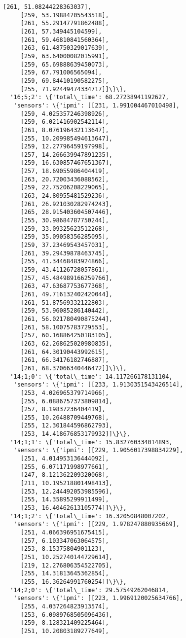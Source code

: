 \documentclass[11pt]{article}
\begin{document}
\begin{tcolorbox}[breakable, size=fbox, boxrule=.5pt, pad at break*=1mm, opacityfill=0]
\begin{Verbatim}[commandchars=\\\{\}]
     [261, 51.08244228363037],
     [259, 53.19884705543518],
     [261, 55.29147791862488],
     [261, 57.349445104599],
     [261, 59.46810841560364],
     [263, 61.48750329017639],
     [259, 63.64000082015991],
     [259, 65.69888639450073],
     [259, 67.791006565094],
     [259, 69.84410190582275],
     [255, 71.92449474334717]]\}\},
  '16;5;2': \{'total\_time': 68.27238941192627,
   'sensors': \{'ipmi': [[231, 1.991004467010498],
     [259, 4.025357246398926],
     [259, 6.021416902542114],
     [261, 8.076196432113647],
     [255, 10.209985494613647],
     [259, 12.27796459197998],
     [257, 14.266639947891235],
     [259, 16.630857467651367],
     [257, 18.69055986404419],
     [263, 20.72003436088562],
     [259, 22.75206208229065],
     [263, 24.80955481529236],
     [261, 26.921030282974243],
     [265, 28.915403604507446],
     [255, 30.98684787750244],
     [259, 33.09325623512268],
     [259, 35.09058356285095],
     [259, 37.23469543457031],
     [261, 39.29439878463745],
     [255, 41.34468483924866],
     [259, 43.41126728057861],
     [257, 45.484989166259766],
     [263, 47.63687753677368],
     [261, 49.716132402420044],
     [261, 51.87569332122803],
     [259, 53.96085286140442],
     [261, 56.021780490875244],
     [261, 58.10075783729553],
     [257, 60.168864250183105],
     [263, 62.268625020980835],
     [261, 64.30190443992615],
     [261, 66.34176182746887],
     [261, 68.37066340446472]]\}\},
  '14;1;0': \{'total\_time': 14.117266178131104,
   'sensors': \{'ipmi': [[233, 1.9130351543426514],
     [253, 4.026965379714966],
     [255, 6.0886757373809814],
     [257, 8.19837236404419],
     [255, 10.26488709449768],
     [255, 12.301844596862793],
     [253, 14.418676853179932]]\}\},
  '14;1;1': \{'total\_time': 15.832760334014893,
   'sensors': \{'ipmi': [[229, 1.9056017398834229],
     [251, 4.014953136444092],
     [255, 6.071171998977661],
     [247, 8.121362209320068],
     [211, 10.195218801498413],
     [253, 12.244492053985596],
     [255, 14.35895299911499],
     [253, 16.40462613105774]]\}\},
  '14;1;2': \{'total\_time': 16.32050848007202,
   'sensors': \{'ipmi': [[229, 1.978247880935669],
     [251, 4.066396951675415],
     [257, 6.103347063064575],
     [253, 8.15375804901123],
     [251, 10.252740144729614],
     [219, 12.276806354522705],
     [255, 14.31813645362854],
     [255, 16.36264991760254]]\}\},
  '14;2;0': \{'total\_time': 29.57549262046814,
   'sensors': \{'ipmi': [[223, 1.9969120025634766],
     [255, 4.037264823913574],
     [253, 6.0989768505096436],
     [259, 8.128321409225464],
     [251, 10.20803189277649],

\end{Verbatim}
\end{tcolorbox}
\end{document}
